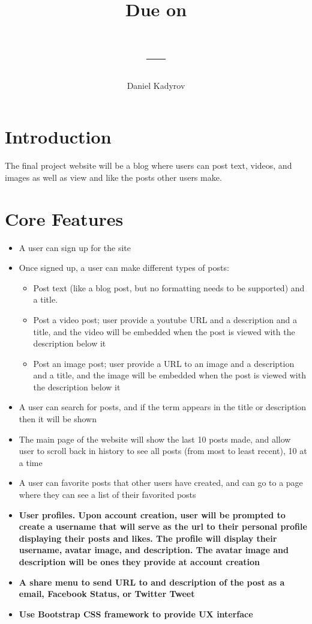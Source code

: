 \documentclass{homework}
\title{
    \Title\\
    \vspace{2mm}
    \large
    Due on \DueDate\\
    \ClassName\\ 
    \ClassNumber---\ClassSection\\
    \Instructor
}
\author{Daniel Kadyrov}
\date{}
\begin{document}
\maketitle
\thispagestyle{empty}

\section{Introduction}

The final project website will be a blog where users can post text, videos, and images as well as view and like the posts other users make.

\section{Core Features}
\begin{itemize}
    \item A user can sign up for the site
    \item Once signed up, a user can make different types of posts:
    \begin{itemize}
        \item Post text (like a blog post, but no formatting needs to be supported) and a title.
        \item Post a video post; user provide a youtube URL and a description and a title, and the video will be embedded when the post is viewed with the description below it
        \item Post an image post; user provide a URL to an image and a description and a title, and the image will be embedded when the post is viewed with the description below it
    \end{itemize}
    \item A user can search for posts, and if the term appears in the title or description then it will be shown
    \item The main page of the website will show the last 10 posts made, and allow user to scroll back in history to see all posts (from most to least recent), 10 at a time
    \item A user can favorite posts that other users have created, and can go to a page where they can see a list of their favorited posts
    \item \textbf{User profiles. Upon account creation, user will be prompted to create a username that will serve as the url to their personal profile displaying their posts and likes. The profile will display their username, avatar image, and description. The avatar image and description will be ones they provide at account creation}
    \item \textbf{A share menu to send URL to and description of the post as a email, Facebook Status, or Twitter Tweet}
    \item \textbf{Use Bootstrap CSS framework to provide UX interface}
\end{itemize}
\end{document}
